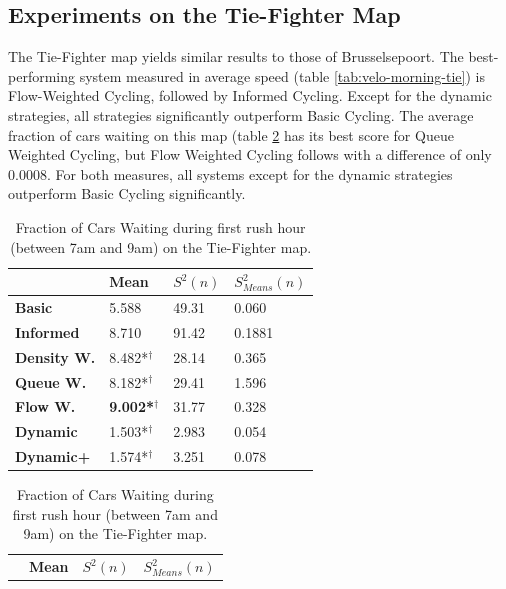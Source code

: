 \documentclass[11pt]{article}
\begin{document}
\subsection{Experiments on the Tie-Fighter Map}
The Tie-Fighter map yields similar results to those of Brusselsepoort. The best-performing system measured in average speed (table \ref{tab:velo-morning-tie}) is Flow-Weighted Cycling, followed by Informed Cycling. Except for the dynamic strategies, all strategies significantly outperform Basic Cycling. The average fraction of cars waiting on this map (table \ref{tab:waiting-morning-tie} has its best score for Queue Weighted Cycling, but Flow Weighted Cycling follows with a difference of only 0.0008. For both measures, all systems except for the dynamic strategies outperform Basic Cycling significantly.

\begin{table}[h]
\centering
\caption{Average Velocity of Cars during first rush hour (between 7am and 9am) on the Tie-Fighter map.}
\label{tab:velo-morning-tie}
\begin{tabular}{l|l|l|l|}
\textbf{}                 & \textbf{Mean} & \textbf{$S^2(n)$} & \textbf{$S_{Means}^2(n)$} \\
\hline\textbf{Basic}            & 5.588          & 49.31             & 0.060                      \\
\textbf{Informed}         & 8.710          & 91.42             & 0.1881                     \\
\hline\textbf{Density W.} & 8.482*$^\dagger$          & 28.14             & 0.365                      \\
\textbf{Queue W.}   & 8.182*$^\dagger$          & 29.41             & 1.596                      \\
\textbf{Flow W.}    & \textbf{9.002*$^\dagger$} & 31.77             & 0.328                      \\
\textbf{Dynamic}          & 1.503*$^\dagger$          & 2.983             & 0.054                      \\
\textbf{Dynamic+}         & 1.574*$^\dagger$          & 3.251             & 0.078                   
\end{tabular}
\vspace{20pt}
\centering
\caption{Fraction of Cars Waiting during first rush hour (between 7am and 9am) on the Tie-Fighter map.}
\label{tab:waiting-morning-tie}
\begin{tabular}{l|l|l|l|}
\textbf{}                 & \textbf{Mean} & \textbf{$S^2(n)$} & \textbf{$S_{Means}^2(n)$} \\

\end{tabular}
\end{table}
\end{document}
